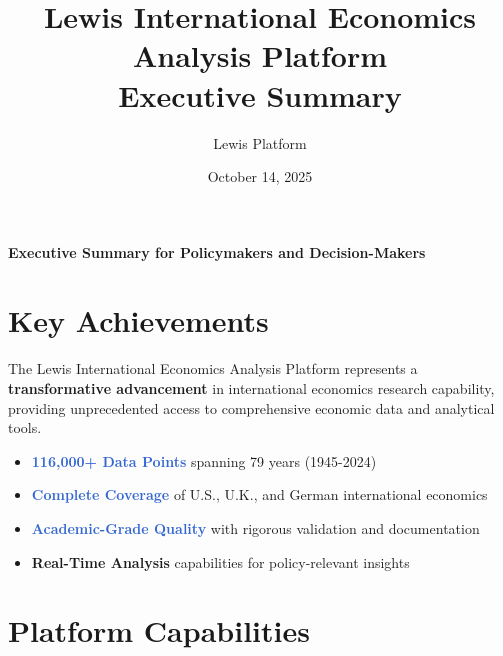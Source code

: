 \documentclass[11pt,a4paper]{article}
\title{\textbf{Lewis International Economics Analysis Platform} \\
\large Executive Summary}
\author{Lewis Platform}
\date{October 14, 2025}
\begin{document}
\maketitle

\begin{center}
\textbf{\large Executive Summary for Policymakers and Decision-Makers}
\end{center}

\vspace{0.5cm}

\section{Key Achievements}

The Lewis International Economics Analysis Platform represents a \textbf{transformative advancement} in international economics research capability, providing unprecedented access to comprehensive economic data and analytical tools.

\begin{itemize}
    \item \textcolor{highlight}{\textbf{116,000+ Data Points}} spanning 79 years (1945-2024)
    \item \textcolor{highlight}{\textbf{Complete Coverage}} of U.S., U.K., and German international economics
    \item \textcolor{highlight}{\textbf{Academic-Grade Quality}} with rigorous validation and documentation
    \item \textbf{Real-Time Analysis} capabilities for policy-relevant insights
\end{itemize}

\section{Platform Capabilities}
\end{document}
